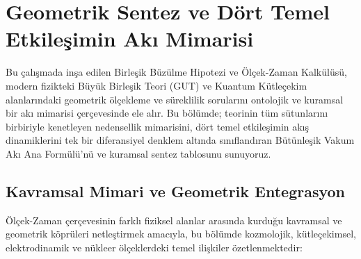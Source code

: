 \section{Geometrik Sentez ve Dört Temel Etkileşimin Akı Mimarisi}
\label{sec:mantik_zincirleri}

Bu çalışmada inşa edilen Birleşik Büzülme Hipotezi ve Ölçek-Zaman Kalkülüsü, modern fizikteki Büyük Birleşik Teori (GUT) ve Kuantum Kütleçekim alanlarındaki geometrik ölçekleme ve süreklilik sorularını ontolojik ve kuramsal bir akı mimarisi çerçevesinde ele alır. Bu bölümde; teorinin tüm sütunlarını birbiriyle kenetleyen nedensellik mimarisini, dört temel etkileşimin akış dinamiklerini tek bir diferansiyel denklem altında sınıflandıran Bütünleşik Vakum Akı Ana Formülü'nü ve kuramsal sentez tablosunu sunuyoruz.

\subsection{Kavramsal Mimari ve Geometrik Entegrasyon}
\label{sec:zincirler_alt}

Ölçek-Zaman çerçevesinin farklı fiziksel alanlar arasında kurduğu kavramsal ve geometrik köprüleri netleştirmek amacıyla, bu bölümde kozmolojik, kütleçekimsel, elektrodinamik ve nükleer ölçeklerdeki temel ilişkiler özetlenmektedir:


